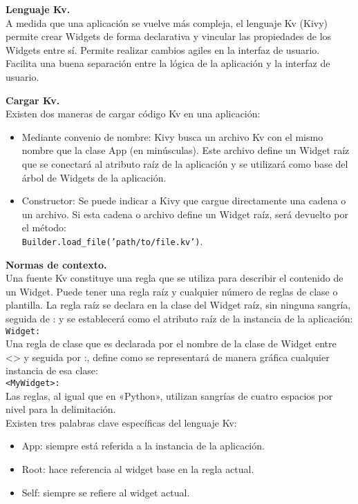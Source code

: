 \textbf{Lenguaje Kv.}\\
A medida que una aplicación se vuelve más compleja, el lenguaje Kv (Kivy) permite crear Widgets de forma declarativa y vincular las propiedades de los Widgets entre sí. Permite realizar cambios agiles en la interfaz de usuario. Facilita una buena separación entre la lógica de la aplicación y la interfaz de usuario.

\textbf{Cargar Kv.}\\
Existen dos maneras de cargar código Kv en una aplicación:
\begin{itemize}
\item Mediante convenio de nombre:
Kivy busca un archivo Kv con el mismo nombre que la clase App (en minúsculas). Este archivo define un Widget raíz que se conectará al atributo raíz de la aplicación y se utilizará como base del árbol de Widgets de la aplicación.
\item Constructor: Se puede indicar a Kivy que cargue directamente una cadena o un archivo. Si esta cadena o archivo define un Widget raíz, será devuelto por el método:\\
\texttt{Builder.load\_file('path/to/file.kv')}.\\
\end{itemize}

\textbf{Normas de contexto.}\\
Una fuente Kv constituye una regla que se utiliza para describir el contenido de un Widget. Puede tener una regla raíz y cualquier número de reglas de clase o plantilla.
La regla raíz se declara en la clase del Widget raíz, sin ninguna sangría, seguida de : y se establecerá como el atributo raíz de la instancia de la aplicación:\\
\texttt{Widget:}\\
Una regla de clase que es declarada por el nombre de la clase de Widget entre <> y seguida por :, define como se representará de manera gráfica cualquier instancia de esa clase:\\
\texttt{<MyWidget>:}\\
Las reglas, al igual que en «Python», utilizan sangrías de cuatro espacios por nivel para la delimitación.\\
Existen tres palabras clave específicas del lenguaje Kv:
\begin{itemize}
\item App: siempre está referida a la instancia de la aplicación.
\item Root: hace referencia al widget base en la regla actual.
\item Self: siempre se refiere al widget actual.
\end{itemize}

